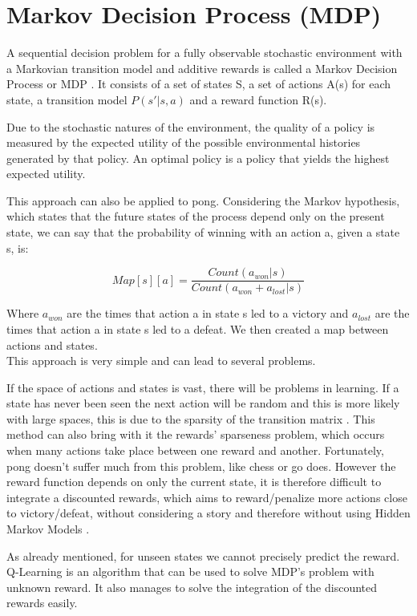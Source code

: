 \section{Markov Decision Process (MDP)}

A sequential decision problem for a fully observable stochastic environment with a Markovian transition model and additive rewards is called a Markov Decision Process or MDP \cite{russell2002artificial}.
It consists of a set of states S, a set of actions A(s) for each state, a transition model 
 $P(s' | s, a)$ and a reward function R(s).

Due to the stochastic natures of the environment, the quality of a policy is measured by the expected utility of the possible environmental histories generated by that policy. An optimal policy is a policy that yields the highest expected utility.

This approach can also be applied to pong. 
Considering the Markov hypothesis, which states that the future states of the process depend only on the present state, we can say that the probability of winning with an action a, given a state s, is:

\[ { Map[s][a] = \frac{ Count(a_{won} | s) }{ Count(a_{won} + a_{lost} | s) } } \]

Where $a_{won}$ are the times that action a in state s led to a victory and 
$a_{lost}$ are the times that action a in state s led to a defeat.
We then created a map between actions and states. \\
 
This approach is very simple and can lead to several problems.

If the space of actions and states is vast, there will be problems in learning. 
If a state has never been seen the next action will be random and this is more 
likely with large spaces, this is due to the sparsity of the transition matrix \cite{silver2015}.
This method can also bring with it the rewards' sparseness problem, which occurs when many 
actions take place between one reward and another. 
Fortunately, pong doesn't suffer much from this problem, like chess or go does.
However the reward function depends on only the current state, it is 
therefore difficult to integrate a discounted rewards, which aims to reward/penalize 
more actions close to victory/defeat, without considering a story and therefore 
without using Hidden Markov Models \cite{silver2015}.

As already mentioned, for unseen states we cannot precisely predict the reward. 
Q-Learning is an algorithm that can be used to solve MDP's problem with unknown reward.
It also manages to solve the integration of the discounted rewards easily.











